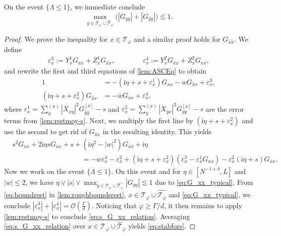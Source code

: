 \documentclass[10pt,a4paper]{amsart}
\newcommand{\ii}{\mathrm{i}}
\newcommand{\abs}[1]{\left| #1 \right|}
\newcommand{\eps}{\varepsilon}
\numberwithin{equation}{section}
\newcommand*\barr[1]{\overline{#1}}
\newcommand*\bset[1]{[#1]}
\newcommand*\ubarr[1]{{\widehat{#1}}}
\begin{document}
	On the event $\{ \Lambda \leq 1 \}$, we immediate conclude 
	\begin{equation} \label{eq:G_xx_typical} 
	\max_{y \in  \mathcal T_{\varphi} \cup \ubarr{\mathcal T}_{\varphi}} \big( \abs{G_{yy}} + \abs{G_{\ubarr{y}y}} \big) \lesssim 1. 
	\end{equation}
	\begin{proof}%
		We prove the inequality for $x \in \mathcal{T}_{\varphi} $ and a similar proof holds for $G_{\ubarr{x}\ubarr{x}}$. We define 
		\begin{align*}
			\eps^3_x := Y_{x}^1 G_{xx} + Z^{1}_{x} G_{\ubarr{x}x}, \qquad \qquad  \eps^4_x := Y_{x}^2 G_{\ubarr{x}x} + Z^{2}_{x} G_{xx}, 
		\end{align*}
		and rewrite the first and third equations of \cref{lem:ASCEq}  to obtain 
		\begin{align*}
			1 &= - (\ii\eta +s+ \eps_{x}^1) G_{xx} - w G_{\ubarr{x}x} + \eps_x^3,\\
			(\ii\eta  + s + \eps^2_{x}) G_{\ubarr{x}x} &= -\barr{w}G_{xx} + \eps_{x}^4,
		\end{align*}
		where $\eps_{x}^1 = \sum_{y}^{(x)} \abs{X_{xy}}^2G_{\ubarr{y}\ubarr{y}}^{\bset{x}} - s$ and $\eps_{x}^2 = \sum_{y}^{(x)} \abs{X_{yx}}^2G_{yy}^{\bset{x}} - s$ are the error terms from \cref{lem:restmoy-s}. Next, we multiply the first line by $(\ii\eta +  s + \eps^2_{x})$ and use the second to get rid 
		of $G_{\ubarr{x}x}$ in the resulting identity. This yields  
		\begin{equation}\label{eq:Giifunctionofs}
			\begin{aligned}
				& s^2 G_{xx} + 2\ii\eta s G_{xx} + s + (\ii\eta ^2 - \abs{w}^2) G_{xx} + \ii\eta  \\ 
				& \qquad \qquad\qquad \qquad \qquad 	=- w \eps_{x}^4 - \eps_{x}^2  + (\ii\eta +s+\eps_{x}^2)(\eps_{x}^3 - \eps_{x}^1G_{xx}) - \eps_{x}^2(\ii\eta +s) G_{xx}.
			\end{aligned} 
		\end{equation}
		Now we work on the event $ \{\Lambda \leq 1\}$. On this event and for $\eta \in [N^{-1+ \delta},L]$ and $\abs{w} \le 2$, we have $\eta\vee \abs{s} \vee \max_{y \in \mathcal T_{\varphi} \cup \widehat{\mathcal T_{\varphi}}} \abs{G_{yy}} \lesssim 1$ due to \cref{eq:G_xx_typical}.  
		From \eqref{eq:boundrest} in \cref{lem:roughboundsrest}, $x \in \mathcal T_{\varphi} \cup \widehat{\mathcal T_{\varphi}}$ and \cref{eq:G_xx_typical}, we conclude $\abs{\eps_{x}^3}+\abs{\eps_{x}^4}= \mathcal{O} (  \frac{\Gamma}{d} )$.
		Noticing that $\varphi \ge \Gamma/d$, it then remains to apply \cref{lem:restmoy-s} to conclude \eqref{eq:s_G_xx_relation}. 
		Averaging \eqref{eq:s_G_xx_relation} over $x \in \mathcal T_{\varphi} \cup \ubarr{\mathcal T}_\varphi$ yields \eqref{eq:stabfors}. 
	\end{proof}
	
\end{document}
